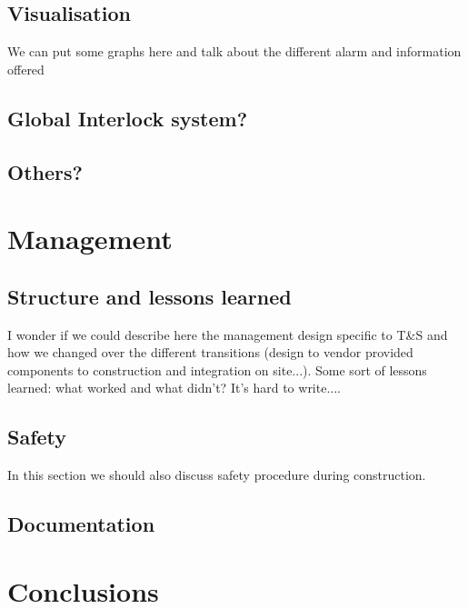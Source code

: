 \subsection{Visualisation}
We can put some graphs here and talk about the different alarm and information offered
\subsection{Global Interlock system?}
\subsection{Others?}

\section{Management}
\subsection{Structure and lessons learned}
I wonder if we could describe here the management design specific to T\&S and how we changed over the different transitions (design to vendor provided components to construction and integration on site...). Some sort of lessons learned: what worked and what didn't? It's hard to write.... \\

\subsection{Safety}
In this section we should also discuss safety procedure during construction. 
\subsection{Documentation}

\section{Conclusions} 
